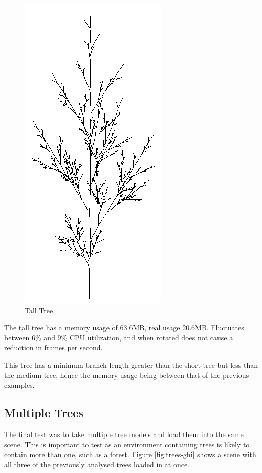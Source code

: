 \documentclass[final]{cmpreport}
\begin{document}
\begin{figure}[ht]
    \includegraphics[scale=0.7]{tree-i.PNG} 
    \centering
    \captionsetup{justification=centering}
    \caption{Tall Tree.}
    \label{fig:tree-i}
\end{figure}

The tall tree has a memory usage of 63.6MB, real usage 20.6MB. Fluctuates between 6\% and 9\% 
CPU utilization, and when rotated does not cause a reduction in frames per second.

This tree has a minimum branch length greater than the short tree but less than the medium tree,
hence the memory usage being between that of the previous examples.

\pagebreak
\subsection{Multiple Trees}
The final test was to take multiple tree models and load them into the same scene. This is 
important to test as an environment containing trees is likely to contain more than one, such as 
a forest. Figure \ref{fig:trees-ghi} shows a scene with all three of the previously analysed 
trees loaded in at once. 
\end{document}
